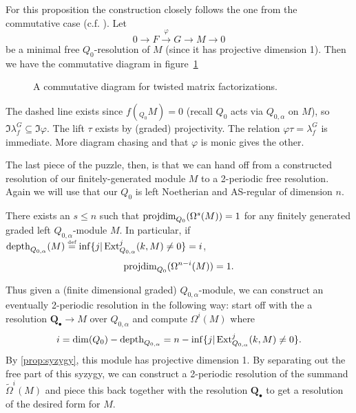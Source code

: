 \documentclass [11pt, proquest] {uwthesis}[2020/02/24]
\begin{document}
    For this proposition the construction closely follows the one from the commutative case (c.f. \cite{yoshino90}). Let
    \[0\to F\xrightarrow{\varphi}G\to M\to 0\]
    be a minimal free $Q_0$-resolution of $M$ (since it has projective dimension 1). Then we have the commutative diagram in figure~\ref{fig:factorization-diagram}
    \begin{figure}[ht!]
        \centering
        \caption{A commutative diagram for twisted matrix factorizations.}
        \label{fig:factorization-diagram}
    \end{figure}
    
    The dashed line exists since $f(_{Q_0}M)=0$ (recall $Q_0$ acts via $Q_{0,\alpha}$ on $M$), so $\Im\lambda_f^G\subseteq\Im\varphi$. The lift $\tau$ exists by (graded) projectivity. The relation $\varphi\tau=\lambda_f^G$ is immediate. More diagram chasing and that $\varphi$ is monic gives the other.
    
    The last piece of the puzzle, then, is that we can hand off from a constructed resolution of our finitely-generated module $M$ to a 2-periodic free resolution. Again we will use that our $Q_0$ is left Noetherian and AS-regular of dimension $n$. 
    
    \begin{prop}\label{prop:syzygy}
        There exists an $s\le n$ such that $\operatorname{projdim}_{Q_0}(\Omega^s(M))=1$ for any finitely generated graded left $Q_{0,\alpha}$-module $M$. In particular, if $\operatorname{depth}_{Q_{0,\alpha}}(M)\stackrel{\text{\tiny def}}{=}\inf\{j|\operatorname{Ext}^j_{Q_{0,\alpha}}(k,M)\ne0\}=i$,
        \[\operatorname{projdim}_{Q_0}(\Omega^{n-i}(M))=1.\]
    \end{prop}
    
    Thus given a (finite dimensional graded) $Q_{0,\alpha}$-module, we can construct an eventually 2-periodic resolution in the following way: start off with the a resolution $\mathbf{Q}_\bullet\to M$ over $Q_{0,\alpha}$ and compute $\Omega^i(M)$ where \[i=\operatorname{dim}(Q_0)-\operatorname{depth}_{Q_{0,\alpha}}=n-\inf\{j|\operatorname{Ext}_{Q_{0,\alpha}}^j(k,M)\ne 0\}.\]
    By \ref{prop:syzygy}, this module has projective dimension 1. By separating out the free part of this syzygy, we can construct a 2-periodic resolution of the summand $\widetilde\Omega^i(M)$ and piece this back together with the resolution $\mathbf{Q}_\bullet$ to get a resolution of the desired form for $M$.
\end{document}
